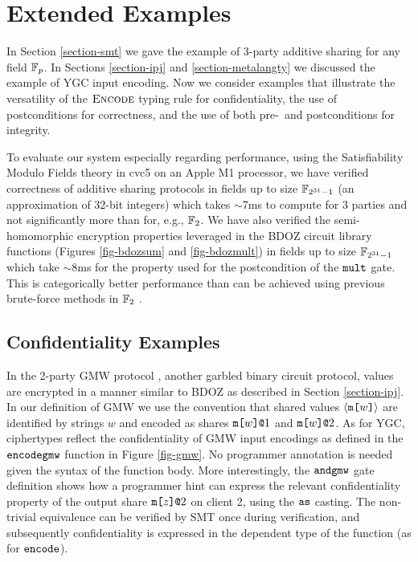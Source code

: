 \section{Extended Examples}
\label{section-examples}

In Section \ref{section-smt} we gave the example of 3-party additive
sharing for any field $\mathbb{F}_{p}$. In Sections \ref{section-ipj} and
\ref{section-metalangty} we discussed the example of YGC input encoding.
Now we consider examples that illustrate the versatility of the
$\text{\sc Encode}$ typing rule for confidentiality, the use of
postconditions for correctness, and the use of both pre-~and
postconditions for integrity.

To evaluate our system especially regarding performance, using the
Satisfiability Modulo Fields theory in cvc5 on an Apple M1 processor,
we have verified correctness of additive sharing protocols in fields
up to size $\mathbb{F}_{2^{31} - 1}$ (an approximation of 32-bit integers)
which takes $\sim$7ms to compute for 3 parties and not significantly more
than for, e.g., $\mathbb{F}_{2}$. We have also verified the semi-homomorphic
encryption properties leveraged in the BDOZ circuit library functions
(Figures \ref{fig-bdozsum} and \ref{fig-bdozmult}) in fields up to
size $\mathbb{F}_{2^{31} - 1}$ which take $\sim$8ms for the property used for
the postcondition of the $\texttt{mult}$ gate. This is categorically
better performance than can be achieved using previous brute-force
methods in $\mathbb{F}_{2}$ \cite{skalka-near-ppdp24}.

\subsection{Confidentiality Examples}



In the 2-party GMW protocol \cite{evans2018pragmatic}, another garbled
binary circuit protocol, values are encrypted in a manner similar to
BDOZ as described in Section \ref{section-ipj}. In our definition of
GMW we use the convention that shared values $\langle \texttt{m[}w\texttt{]} \rangle$ are
identified by strings $w$ and encoded as shares $\texttt{m[}w\texttt{]}\texttt{@}1$ and
$\texttt{m[}w\texttt{]}\texttt{@}2$.  As for YGC, ciphertypes reflect the confidentiality of
GMW input encodings as defined in the $\texttt{encodegmw}$ function in
Figure \ref{fig-gmw}. No programmer annotation is needed given the
syntax of the function body. More interestingly, the $\texttt{andgmw}$
gate definition shows how a programmer hint can express the relevant
confidentiality property of the output share $\texttt{m[}z\texttt{]}\texttt{@}2$ on client 2,
using the $\texttt{as}$ casting. The non-trivial equivalence can be
verified by SMT once during verification, and subsequently
confidentiality is expressed in the dependent type of the function (as
for $\texttt{encode}$).

